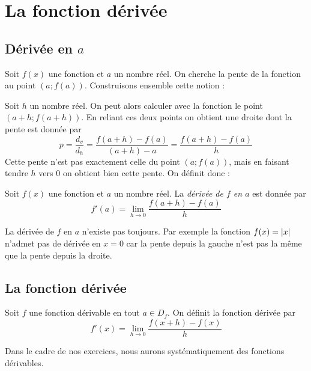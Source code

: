 \chapter{La fonction dérivée}

\section{Dérivée en $a$}

Soit $f(x)$ une fonction et $a$ un nombre réel. On cherche la pente de la fonction au point $\left(a;f(a)\right)$. Construisons ensemble cette notion :

Soit $h$ un nombre réel. On peut alors calculer avec la fonction le point $\left(a+h; f(a+h)\right)$. En reliant ces deux points on obtient une droite dont la pente est donnée par
$$
p = \frac{d_v}{d_h} = \frac{f(a+h)-f(a)}{(a+h)-a} = \frac{f(a+h)-f(a)}{h}
$$
Cette pente n'est pas exactement celle du point $\left(a;f(a)\right)$, mais en faisant tendre $h$ vers $0$ on obtient bien cette pente. On définit donc :

\begin{definition}
Soit $f(x)$ une fonction et $a$ un nombre réel. La \emph{dérivée de $f$ en $a$} est donnée par
$$
f'(a) =  \lim_{h\rightarrow 0}\frac{f(a+h)-f(a)}{h}
$$
\end{definition}

\begin{remarque}
La dérivée de $f$ en $a$ n'existe pas toujours. Par exemple la fonction $f(x) = \left|x\right|$ n'admet pas de dérivée en $x=0$ car la pente depuis la gauche n'est pas la même que la pente depuis la droite.
\end{remarque}

\section{La fonction dérivée}

\begin{definition}
Soit $f$ une fonction dérivable en tout $a\in D_f$. On définit la fonction dérivée par 
$$
f'(x) =  \lim_{h\rightarrow 0}\frac{f(x+h)-f(x)}{h}
$$
\end{definition}

Dans le cadre de nos exercices, nous aurons systématiquement des fonctions dérivables.


